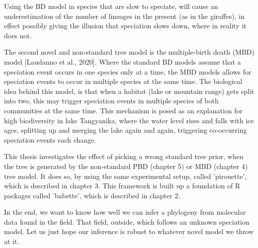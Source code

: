 %
%
%

Using the BD model in species that are slow to speciate, will cause
an underestimation of the number of lineages in the present (as in the
giraffes), in effect possibly giving the illusion that speciation 
slows down, where in reality it does not. 

%
%
%
%
%

%
%
%

The second novel and non-standard tree model is the multiple-birth 
death (MBD) model [Laudanno et al., 2020].
Where the standard BD models assume that a speciation event occurs in one
species only at a time, the MBD models allows for speciation events
to occur in multiple species at the same time.
The biological idea behind this model, is that when a 
habitat (lake or mountain range) gets split into two, 
this may trigger speciation events in multiple species
of both communities at the same time. 
This mechanism is posed as an
explanation for high biodiversity in lake Tangyanika,
where the water level rises and falls with ice ages,
splitting up and merging the lake again and again, 
triggering co-occurring speciation events each change. 

%
%
%

This thesis investigates the effect of picking a wrong standard
tree prior, when the tree is generated 
by the non-standard PBD (chapter 5) or MBD (chapter 4) tree model.
It does so, by using the same experimental setup, called 'pirouette',
which is described in chapter 3. This framework is built up a foundation
of R packages called 'babette', which is described in chapter 2.

%
%

In the end, we want to know how well we can infer a phylogeny from
molecular data found in the field. That field, outside, 
which follows an unknown speciation model. Let us just hope our inference
is robust to whatever novel model we throw at it.

